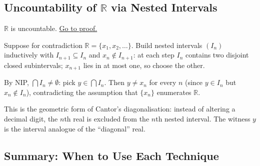 \subsection*{\texorpdfstring{Uncountability of $\mathbb{R}$ via Nested Intervals}{Uncountability of R via Nested Intervals}}
\label{subsec:uncountable}

\begin{proposition}
\label{prop:r-uncountable}
$\mathbb{R}$ is uncountable.
\hyperref[prf:r-uncountable]{Go to proof.}
\end{proposition}

\begin{remark*}
\end{remark*}


\begin{remark}
Suppose for contradiction $\mathbb{R}=\{x_1,x_2,\ldots\}$. Build nested
intervals $(I_n)$ inductively with $I_{n+1}\subseteq I_n$ and
$x_n\notin I_{n+1}$: at each step $I_n$ contains two disjoint closed
subintervals; $x_{n+1}$ lies in at most one, so choose the other.

By NIP, $\bigcap I_n\neq\emptyset$: pick $y\in\bigcap I_n$. Then
$y\neq x_n$ for every $n$ (since $y\in I_n$ but $x_n\notin I_n$),
contradicting the assumption that $\{x_n\}$ enumerates $\mathbb{R}$.
\end{remark}

\begin{remark}
This is the geometric form of Cantor's diagonalisation: instead of
altering a decimal digit, the $n$th real is excluded from the $n$th nested
interval. The witness $y$ is the interval analogue of the ``diagonal'' real.
\end{remark}

\subsection*{Summary: When to Use Each Technique}

